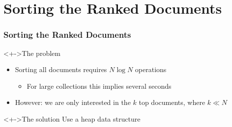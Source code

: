 \documentclass[svgnames]{beamer}
\begin{document}

\section{Sorting the Ranked Documents}

\begin{frame}
  \frametitle{Sorting the Ranked Documents}
  
  \begin{block}<+->{The problem}
    \begin{itemize}
    \item Sorting all documents requires $N \log N$ operations
      \begin{itemize}
      \item For large collections this implies several seconds
      \end{itemize}
    \item However: we are only interested in the $k$ top documents, where $k
      \ll N$
    \end{itemize}
  \end{block}

  \begin{block}<+->{The solution}
    Use a heap data structure
  \end{block}
\end{frame}

\end{document}
